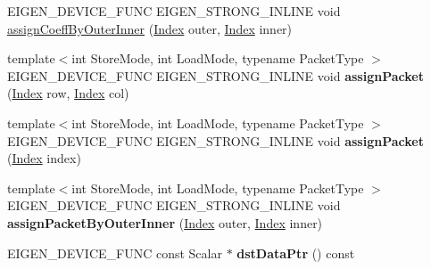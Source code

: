 \begin{DoxyCompactItemize}
\item 
E\+I\+G\+E\+N\+\_\+\+D\+E\+V\+I\+C\+E\+\_\+\+F\+U\+NC E\+I\+G\+E\+N\+\_\+\+S\+T\+R\+O\+N\+G\+\_\+\+I\+N\+L\+I\+NE void \hyperlink{class_eigen_1_1internal_1_1generic__dense__assignment__kernel_aff1bc113e270d4f895ca90570536303b}{assign\+Coeff\+By\+Outer\+Inner} (\hyperlink{namespace_eigen_a62e77e0933482dafde8fe197d9a2cfde}{Index} outer, \hyperlink{namespace_eigen_a62e77e0933482dafde8fe197d9a2cfde}{Index} inner)
\item 
\mbox{\label{class_eigen_1_1internal_1_1generic__dense__assignment__kernel_aaed04d17fc441168ff9d7dfbda9f7c6e}} 
{\footnotesize template$<$int Store\+Mode, int Load\+Mode, typename Packet\+Type $>$ }\\E\+I\+G\+E\+N\+\_\+\+D\+E\+V\+I\+C\+E\+\_\+\+F\+U\+NC E\+I\+G\+E\+N\+\_\+\+S\+T\+R\+O\+N\+G\+\_\+\+I\+N\+L\+I\+NE void {\bfseries assign\+Packet} (\hyperlink{namespace_eigen_a62e77e0933482dafde8fe197d9a2cfde}{Index} row, \hyperlink{namespace_eigen_a62e77e0933482dafde8fe197d9a2cfde}{Index} col)
\item 
\mbox{\label{class_eigen_1_1internal_1_1generic__dense__assignment__kernel_a152c4bd979ed06358343fa77edc037a7}} 
{\footnotesize template$<$int Store\+Mode, int Load\+Mode, typename Packet\+Type $>$ }\\E\+I\+G\+E\+N\+\_\+\+D\+E\+V\+I\+C\+E\+\_\+\+F\+U\+NC E\+I\+G\+E\+N\+\_\+\+S\+T\+R\+O\+N\+G\+\_\+\+I\+N\+L\+I\+NE void {\bfseries assign\+Packet} (\hyperlink{namespace_eigen_a62e77e0933482dafde8fe197d9a2cfde}{Index} index)
\item 
\mbox{\label{class_eigen_1_1internal_1_1generic__dense__assignment__kernel_a91436c094fad327d8128825e2c8a54cc}} 
{\footnotesize template$<$int Store\+Mode, int Load\+Mode, typename Packet\+Type $>$ }\\E\+I\+G\+E\+N\+\_\+\+D\+E\+V\+I\+C\+E\+\_\+\+F\+U\+NC E\+I\+G\+E\+N\+\_\+\+S\+T\+R\+O\+N\+G\+\_\+\+I\+N\+L\+I\+NE void {\bfseries assign\+Packet\+By\+Outer\+Inner} (\hyperlink{namespace_eigen_a62e77e0933482dafde8fe197d9a2cfde}{Index} outer, \hyperlink{namespace_eigen_a62e77e0933482dafde8fe197d9a2cfde}{Index} inner)
\item 
\mbox{\label{class_eigen_1_1internal_1_1generic__dense__assignment__kernel_a0f15e70d3ced7871f0c9d9b701e7f934}} 
E\+I\+G\+E\+N\+\_\+\+D\+E\+V\+I\+C\+E\+\_\+\+F\+U\+NC const Scalar $\ast$ {\bfseries dst\+Data\+Ptr} () const
\end{DoxyCompactItemize}
